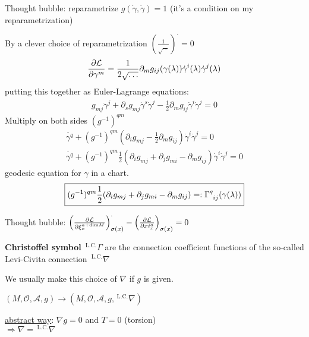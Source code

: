 Thought bubble: reparametrize $g(\dot{\gamma}, \dot{\gamma}) = 1$ (it's a condition on my reparametrization)

By a clever choice of reparametrization $(\frac{1}{\sqrt{\dots}})^{\cdot} = 0$
\[
\begin{gathered}
  \cibasis[\mathcal{L}]{\gamma^m} = \frac{1}{2\sqrt{\dots}} \partial_m g_{ij}(\gamma(\lambda)) \dot{\gamma}^i(\lambda) \dot{\gamma}^j(\lambda)
\end{gathered}
\]
putting this together as Euler-Lagrange equations:
\[
\begin{gathered}
g_{mj} \ddot{\gamma}^j + \partial_s g_{mj} \dot{\gamma}^s \dot{\gamma}^j - \frac{1}{2} \partial_m g_{ij} \dot{\gamma}^i \dot{\gamma}^j = 0
\end{gathered}
\]
Multiply on both sides $(g^{-1})^{qm}$
\[
\begin{gathered}
\ddot{\gamma^q} + (g^{-1})^{qm}(\partial_i g_{mj} - \frac{1}{2} \partial_m g_{ij}) \dot{\gamma}^i \dot{\gamma}^j = 0  \\
\boxed{\ddot{\gamma^q} + (g^{-1})^{qm}\frac{1}{2} (\partial_i g_{mj} + \partial_j g_{mi} - \partial_m g_{ij}) \dot{\gamma}^i \dot{\gamma}^j = 0}
\end{gathered}
\]
geodesic equation for $\gamma$ in a chart.  
\[
\boxed{(g^{-1})^{qm}\frac{1}{2} (\partial_i g_{mj} + \partial_j g_{mi} - \partial_m g_{ij} ) =: \ccf{q}{ij}(\gamma(\lambda))
}
\]

Thought bubble: $\left(\cibasis[\mathcal{L}]{\xi_x^{a+\text{dim}M}} \right)^{\cdot}_{\sigma(x)} - \left(\cibasis[\mathcal{L}]{xi^a_x} \right)_{\sigma(x)} = 0$

\begin{definition}
\textbf{Christoffel symbol} ${\,}^{\text{L.C.}}\Gamma$ are the connection coefficient functions of the so-called Levi-Civita connection ${\,}^{\text{L.C.}}\nabla$
\end{definition}
We usually make this choice of $\nabla$ if $g$ is given.  

$(M, \mathcal{O}, \mathcal{A}, g) \to (M, \mathcal{O}, \mathcal{A}, g, {\,}^{\text{L.C.}}\nabla)$

\underline{abstract way}: $\nabla g = 0$ and $T = 0$ (torsion) \\
$\Longrightarrow \nabla = {\,}^{\text{L.C.}}\nabla$

